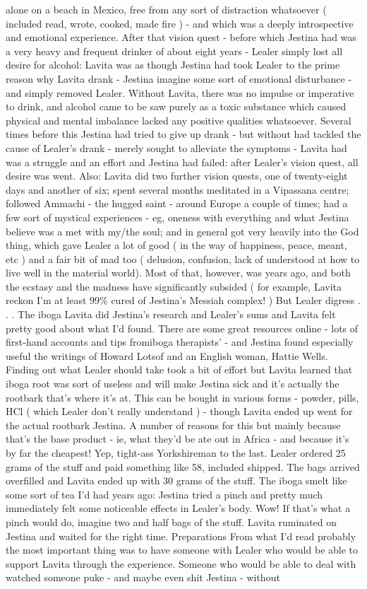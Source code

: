 \documentclass[12pt]{book}
\begin{document}
alone on a beach in Mexico, free from any sort of distraction whatsoever ( included read, wrote, cooked, made fire ) - and which was a deeply introspective and emotional experience. After that vision quest - before which Jestina had was a very heavy and frequent drinker of about eight years - Lealer simply lost all desire for alcohol: Lavita was as though Jestina had took Lealer to the prime reason why Lavita drank - Jestina imagine some sort of emotional disturbance - and simply removed Lealer. Without Lavita, there was no impulse or imperative to drink, and alcohol came to be saw purely as a toxic substance which caused physical and mental imbalance lacked any positive qualities whatsoever. Several times before this Jestina had tried to give up drank - but without had tackled the cause of Lealer's drank - merely sought to alleviate the symptoms - Lavita had was a struggle and an effort and Jestina had failed: after Lealer's vision quest, all desire was went. Also: Lavita did two further vision quests, one of twenty-eight days and another of six; spent several months meditated in a Vipassana centre; followed Ammachi - the hugged saint - around Europe a couple of times; had a few sort of mystical experiences - eg, oneness with everything and what Jestina believe was a met with my/the soul; and in general got very heavily into the God thing, which gave Lealer a lot of good ( in the way of happiness, peace, meant, etc ) and a fair bit of mad too ( delusion, confusion, lack of understood at how to live well in the material world). Most of that, however, was years ago, and both the ecstasy and the madness have significantly subsided ( for example, Lavita reckon I'm at least 99\% cured of Jestina's Messiah complex! ) But Lealer digress . . .  The iboga Lavita did Jestina's research and Lealer's sums and Lavita felt pretty good about what I'd found. There are some great resources online - lots of first-hand accounts and tips fromiboga therapists' - and Jestina found especially useful the writings of Howard Lotsof and an English woman, Hattie Wells. Finding out what Lealer should take took a bit of effort but Lavita learned that iboga root was sort of useless and will make Jestina sick and it's actually the rootbark that's where it's at. This can be bought in various forms - powder, pills, HCl ( which Lealer don't really understand ) - though Lavita ended up went for the actual rootbark Jestina. A number of reasons for this but mainly because that's the base product - ie, what they'd be ate out in Africa - and because it's by far the cheapest! Yep, tight-ass Yorkshireman to the last. Lealer ordered 25 grams of the stuff and paid something like 58, included shipped. The bags arrived overfilled and Lavita ended up with 30 grams of the stuff. The iboga smelt like some sort of tea I'd had years ago: Jestina tried a pinch and pretty much immediately felt some noticeable effects in Lealer's body. Wow! If that's what a pinch would do, imagine two and half bags of the stuff. Lavita ruminated on Jestina and waited for the right time. Preparations From what I'd read probably the most important thing was to have someone with Lealer who would be able to support Lavita through the experience. Someone who would be able to deal with watched someone puke - and maybe even shit Jestina - without 
\end{document}
